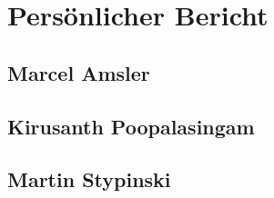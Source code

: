 \newpage

\chapter{Persönlicher Bericht}

\section{Marcel Amsler}


\newpage
\section{Kirusanth Poopalasingam}


\newpage
\section{Martin Stypinski}



